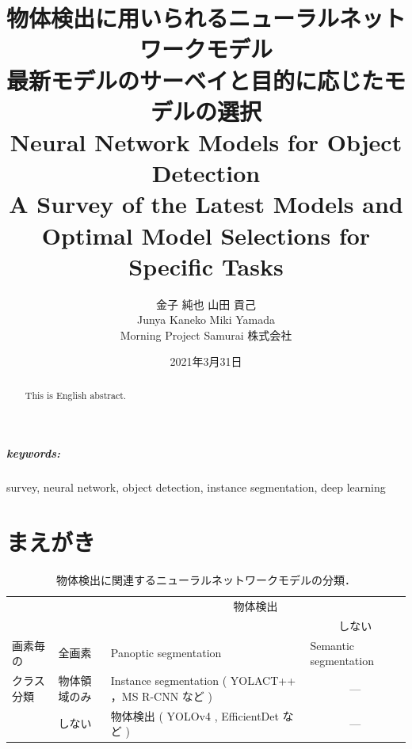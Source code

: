 \documentclass[twocolumn]{jsarticle} %
\begin{document}
\title{物体検出に用いられるニューラルネットワークモデル \\
    \Large 最新モデルのサーベイと目的に応じたモデルの選択 \\
    Neural Network Models for Object Detection \\
    \large A Survey of the Latest Models and Optimal Model Selections for Specific Tasks}
\author{金子 純也 \hspace{15mm} 山田 貢己 \\ Junya Kaneko \qquad Miki Yamada \\ Morning Project Samurai 株式会社}
\date{2021年3月31日}
\maketitle

\subparagraph{keywords:} survey, neural network, object detection, instance segmentation, deep learning

\begin{abstract}
    This is English abstract.
\end{abstract}

\section{まえがき}
\begin{table}
    \caption{物体検出に関連するニューラルネットワークモデルの分類．}
    \label{tbl-select-l}
    \begin{center}
        \setlength{\doublerulesep}{0.5pt}
        \begin{tabularx}{\linewidth}{|p{1.7cm}|p{1.0cm}||X|p{3.3cm}|} \hline
            \multicolumn{2}{|c||}{} & \multicolumn{2}{c|}{物体検出} \\ \cline{3-4}
            \multicolumn{2}{|l||}{} & \centering{する} & \multicolumn{1}{c|}{しない} \\ \hline\hline
            画素毎の & 全画素 & Panoptic segmentation \cite{KHGRD19} & Semantic segmentation \\ \cline{2-4}
            クラス分類 & 物体領域のみ  & Instance segmentation ( YOLACT++ \cite{BZXL20}，MS R-CNN \cite{HHGHW19} など ) &  \multicolumn{1}{c|}{---} \\ \cline{2-4}
            & しない & 物体検出 ( YOLOv4 \cite{BWL20}, EfficientDet \cite{TPL20} など ) & \multicolumn{1}{c|}{---} \\ 
            \hline
        \end{tabularx}
    \end{center}
\end{table}
\end{document}
